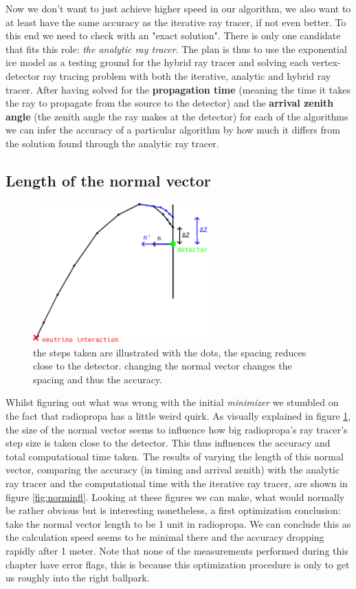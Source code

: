 Now we don't want to just achieve higher speed in our algorithm, we also want
to at least have the same accuracy as the iterative ray tracer, if not even better.
To this end we need to check with an "exact solution". There is only one candidate
that fits this role: \textit{the analytic ray tracer}. The plan is thus to use the
exponential ice model as a testing ground for the hybrid ray tracer and solving each
vertex-detector ray tracing problem with both the iterative, analytic and hybrid ray tracer.
After having solved for the \textbf{propagation time} (meaning the time it takes the ray to
propagate from the source to the detector) and the \textbf{arrival zenith angle} (the zenith angle
the ray makes at the detector) for each of the algorithms we can infer the accuracy of a particular
algorithm by how much it differs from the solution found through the analytic ray tracer.
\subsection{Length of the normal vector}
\begin{figure}
	\centering
	\includegraphics[width=0.6\textwidth]{figures/PrincipleNormIllu.pdf}
	\caption{the steps taken are illustrated with the dots, the spacing reduces close to the detector. changing
	the normal vector changes the spacing and thus the accuracy.}
	\label{fig:normexpl}
\end{figure}
Whilst figuring out what was wrong with the initial \textit{minimizer} we
stumbled on the fact that radiopropa has a little weird quirk.  As visually
explained in figure \ref{fig:normexpl}, the size of the normal vector seems to
influence how big radiopropa's ray tracer's step size is taken close to the
detector.  This thus influences the accuracy and total computational time
taken. The results of varying the length of this normal vector, comparing the
accuracy (in timing and arrival zenith) with the analytic ray tracer and the computational time with the
iterative ray tracer, are shown in figure \ref{fig:norminfl}.  
Looking at these figures we can make, what would
normally be rather obvious but is interesting nonetheless, a first optimization
conclusion: take the normal vector length to be 1 unit in radiopropa.
We can conclude this as the calculation speed seems to be minimal there 
and the accuracy dropping rapidly after 1 meter.
Note that none of the measurements performed during this chapter have
error flags, this is because this optimization procedure is only to get
us roughly into the right ballpark.

